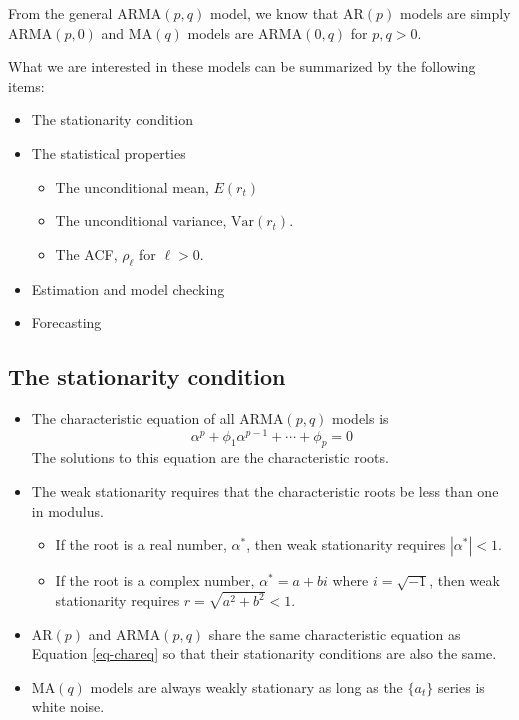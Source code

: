 \documentclass[a4paper,11pt]{article}
\newcommand{\var}{\mathrm{Var}}
\begin{document}
From the general \(\mathrm{ARMA}(p, q)\) model, we know that \(\mathrm{AR}(p)\) models are
simply \(\mathrm{ARMA}(p, 0)\) and \(\mathrm{MA}(q)\) models are \(\mathrm{ARMA}(0, q)\) for \(p, q >
0\). 

What we are interested in these models can be summarized by the
following items:
\begin{itemize}
\item The stationarity condition
\item The statistical properties
\begin{itemize}
\item The unconditional mean, \(E(r_t)\)
\item The unconditional variance, \(\var(r_t)\).
\item The ACF, \(\rho_{\ell}\) for \(\ell > 0\).
\end{itemize}
\item Estimation and model checking
\item Forecasting
\end{itemize}


\subsection{The stationarity condition}
\label{sec:orga6457de}

\begin{itemize}
\item The characteristic equation of all \(\mathrm{ARMA}(p, q)\) models is
\begin{equation}
\label{eq-chareq}
\alpha^p + \phi_1 \alpha^{p-1} + \cdots + \phi_p = 0
\end{equation}
The solutions to this equation are the characteristic roots.

\item The weak stationarity requires that the characteristic roots be less
than one in modulus. 
\begin{itemize}
\item If the root is a real number, \(\alpha^{*}\), then weak stationarity
requires \(|\alpha^{*}| < 1\).
\item If the root is a complex number, \(\alpha^{*} = a + bi\) where \(i =
    \sqrt{-1}\), then weak stationarity requires \(r = \sqrt{a^2 + b^2} < 1\).
\end{itemize}

\item \(\mathrm{AR}(p)\) and \(\mathrm{ARMA}(p,q)\) share the same
characteristic equation as Equation \eqref{eq-chareq} so that their
stationarity conditions are also the same.

\item \(\mathrm{MA}(q)\) models are always weakly stationary as long as the
\(\{a_t\}\) series is white noise.
\end{itemize}
\end{document}
